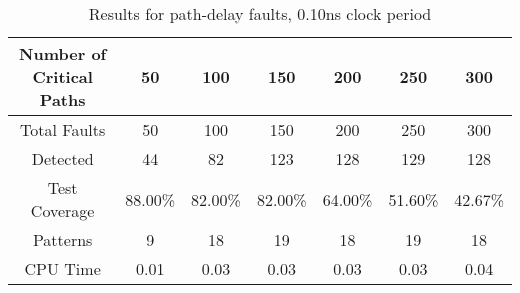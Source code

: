 \documentclass[letterpaper]{article} %
\begin{document}
\begin{table}[ht]
\begin{tabular}{|c|c|c|c|c|c|c|}
\hline
Number of Critical Paths & 50      & 100     & 150     & 200     & 250     & 300     \\ \hline
Total Faults             & 50      & 100     & 150     & 200     & 250     & 300     \\ \hline
Detected                 & 44      & 82      & 123     & 128     & 129     & 128     \\ \hline
Test Coverage            & 88.00\% & 82.00\% & 82.00\% & 64.00\% & 51.60\% & 42.67\% \\ \hline
Patterns                 & 9       & 18      & 19      & 18      & 19      & 18      \\ \hline
CPU Time                 & 0.01    & 0.03    & 0.03    & 0.03    & 0.03    & 0.04    \\ \hline
\end{tabular}
\caption{Results for path-delay faults, 0.10ns clock period}
\end{table}
\end{document}
